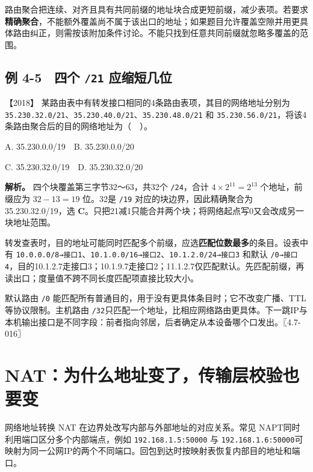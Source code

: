 路由聚合把连续、对齐且具有共同前缀的地址块合成更短前缀，减少表项。若要求\textbf{精确聚合}，不能额外覆盖尚不属于该出口的地址；如果题目允许覆盖空隙并用更具体路由纠正，则需按该附加条件讨论。不能只找到任意共同前缀就忽略多覆盖的范围。

\subsection{\texorpdfstring{例 4-5　四个 \allowbreak{}\texttt{/21} 应缩短几位}{例 4-5　四个 /21 应缩短几位}}\label{cn-ex4-5}

\noindent{}【2018】 某路由表中有转发接口相同的4条路由表项，其目的网络地址分别为 \allowbreak{}\texttt{35.230.32.0/21}、\allowbreak{}\texttt{35.230.40.0/21}、\allowbreak{}\texttt{35.230.48.0/21} 和 \allowbreak{}\texttt{35.230.56.0/21}，将该4条路由聚合后的目的网络地址为（　）。

A. 35.230.0.0/19　B. 35.230.0.0/20

C. 35.230.32.0/19　D. 35.230.32.0/20


\textbf{解析。} 四个块覆盖第三字节32～63，共32个 \allowbreak{}\texttt{/24}，合计 \(4\times2^{11}=2^{13}\) 个地址，前缀应为 \(32-13=19\) 位。32是 \allowbreak{}\texttt{/19} 对应的块边界，因此精确聚合为35.230.32.0/19，选 \textbf{C}。只把21减1只能合并两个块；将网络起点写0又会改成另一块地址范围。

转发查表时，目的地址可能同时匹配多个前缀，应选\textbf{匹配位数最多}的条目。设表中有 \allowbreak{}\texttt{10.0.0.0/8→接口1}、\allowbreak{}\texttt{10.1.0.0/16→接口2}、\allowbreak{}\texttt{10.1.2.0/24→接口3} 和默认 \allowbreak{}\texttt{/0→接口4}，目的10.1.2.7走接口3；10.1.9.7走接口2；11.1.2.7仅匹配默认。先匹配前缀，再读出口；度量值不跨不同长度匹配项直接比较大小。

默认路由 \allowbreak{}\texttt{/0} 能匹配所有普通目的，用于没有更具体条目时；它不改变广播、TTL等协议限制。主机路由 \allowbreak{}\texttt{/32}只匹配一个地址，比相应网络路由更具体。下一跳IP与本机输出接口是不同字段：前者指向邻居，后者确定从本设备哪个口发出。〖4.7-016〗

\section{NAT：为什么地址变了，传输层校验也要变}\label{cn-04-10}

网络地址转换 NAT 在边界处改写内部与外部地址的对应关系。常见 NAPT同时利用端口区分多个内部端点，例如 \allowbreak{}\texttt{192.168.1.5:50000} 与 \allowbreak{}\texttt{192.168.1.6:50000}可映射为同一公网IP的两个不同端口。回包到达时按映射表恢复内部目的地址和端口。

